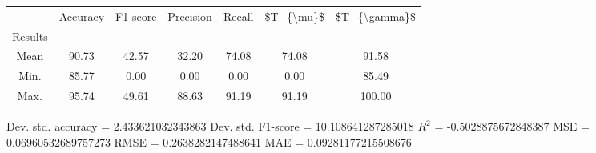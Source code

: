 \begin{tabular}{|c|c|c|c|c|c|c|}
\toprule
{} &  Accuracy &  F1 score &  Precision &  Recall &  \$T\_\{\textbackslash mu\}\$ &  \$T\_\{\textbackslash gamma\}\$ \\
Results &           &           &            &         &            &               \\
\hline
Mean    &     90.73 &     42.57 &      32.20 &   74.08 &      74.08 &         91.58 \\
Min.    &     85.77 &      0.00 &       0.00 &    0.00 &       0.00 &         85.49 \\
Max.    &     95.74 &     49.61 &      88.63 &   91.19 &      91.19 &        100.00 \\
\bottomrule
\end{tabular}

 Dev. std. accuracy = 2.433621032343863
 Dev. std. F1-score = 10.108641287285018
 $R^2$ = -0.5028875672848387
 MSE = 0.06960532689757273
 RMSE = 0.2638282147488641
 MAE = 0.09281177215508676